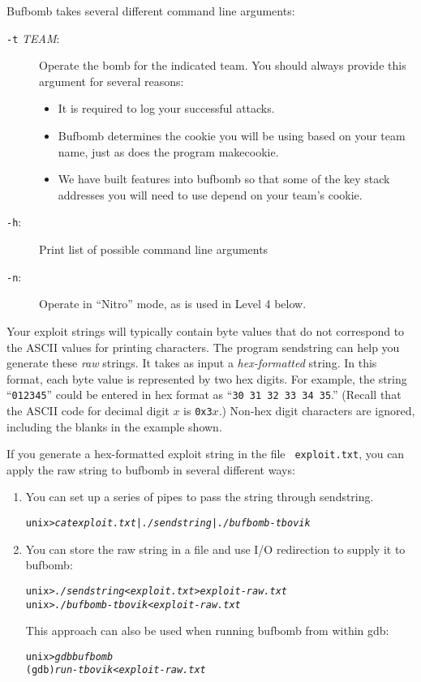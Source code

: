 \documentclass[11pt]{article}
\newenvironment{tty}%
{\small\begin{alltt}}%
{\end{alltt}}
\begin{document}
{\sc Bufbomb} takes several different command line arguments:
\begin{description}
\item[{\tt -t} {\it TEAM}:] Operate the bomb for the indicated team.
You should always provide this argument for several reasons:
\begin{itemize}
\item It is required to log your successful attacks.

\item {\sc Bufbomb} determines the cookie you will be using based on
your team name, just as does the program {\sc makecookie}.

\item
We have built features into {\sc bufbomb} so that some of the key
stack addresses you will need to use depend on your team's cookie.
\end{itemize}
\item[{\tt -h}:] Print list of possible command line arguments
\item[{\tt -n}:] Operate in ``Nitro'' mode, as is used in Level 4 below.
\end{description}

Your exploit strings will typically contain byte values that do not
correspond to the ASCII values for printing characters.  The program
{\sc sendstring} can help you generate these {\em raw} strings.  It
takes as input a {\em hex-formatted} string.  In this format, each
byte value is represented by two hex digits.  For example, the string
``{\tt 012345}'' could be entered in hex format as ``{\tt 30 31 32 33
34 35}.'' (Recall that the ASCII code for decimal digit $x$ is {\tt 0x3}$x$.)
Non-hex digit characters are ignored, including the blanks in the
example shown.

If you generate a hex-formatted exploit string in the file {\tt
exploit.txt}, you can apply the raw string to {\sc bufbomb} in several
different ways:
\begin{enumerate}
\item You can set up a series of pipes to pass the string through {\sc sendstring}.
\begin{tty}
unix>{\em cat exploit.txt | ./sendstring | ./bufbomb -t bovik}
\end{tty}
\item
You can store the raw string in a file and use I/O redirection to supply it to {\sc bufbomb}:
\begin{tty}
unix>{\em ./sendstring < exploit.txt > exploit-raw.txt}
unix>{\em ./bufbomb -t bovik < exploit-raw.txt}
\end{tty}
This approach can also be used when running {\sc bufbomb} from within
{\sc gdb}:
\begin{tty}
unix>{\em gdb bufbomb}
(gdb){\em run -t bovik < exploit-raw.txt}
\end{tty}
\end{enumerate}
\end{document}
